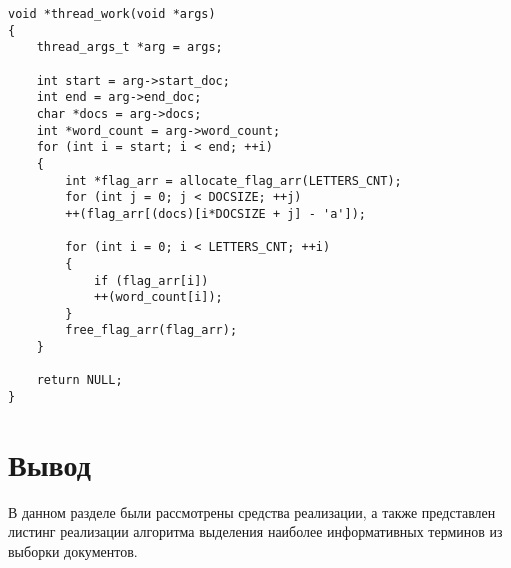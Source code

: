\begin{center}
	\begin{lstlisting}[label=lst:thr,caption=Функция работы одного вспомогательного потока]
void *thread_work(void *args)
{
	thread_args_t *arg = args;
	
	int start = arg->start_doc;
	int end = arg->end_doc;
	char *docs = arg->docs;
	int *word_count = arg->word_count;
	for (int i = start; i < end; ++i)
	{
		int *flag_arr = allocate_flag_arr(LETTERS_CNT);
		for (int j = 0; j < DOCSIZE; ++j)
		++(flag_arr[(docs)[i*DOCSIZE + j] - 'a']);
		
		for (int i = 0; i < LETTERS_CNT; ++i)
		{
			if (flag_arr[i])
			++(word_count[i]);
		}
		free_flag_arr(flag_arr);
	}
	
	return NULL;
}
	\end{lstlisting}
\end{center}



\section*{Вывод}
В данном разделе были рассмотрены средства реализации, а также представлен листинг реализации алгоритма выделения наиболее информативных терминов из выборки документов.